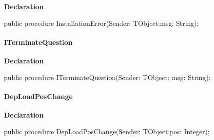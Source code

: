 \documentclass{report}
\newif\ifpdf
\begin{document}
\label{igobase.TIWizFrm-InstallationError}
\begin{list}{}{
\setlength{\itemindent}{0cm}
\setlength{\listparindent}{0cm}
\setlength{\leftmargin}{\evensidemargin}
\addtolength{\leftmargin}{\tmplength}
\settowidth{\labelsep}{X}
\addtolength{\leftmargin}{\labelsep}
\setlength{\labelwidth}{\tmplength}
}
\item[\textbf{Declaration}\hfill]
\ifpdf
\begin{flushleft}
\fi
\begin{ttfamily}
public procedure InstallationError(Sender: TObject;msg: String);\end{ttfamily}

\ifpdf
\end{flushleft}
\fi

\end{list}
\paragraph*{ITerminateQuestion}\hspace*{\fill}

\label{igobase.TIWizFrm-ITerminateQuestion}
\begin{list}{}{
\setlength{\itemindent}{0cm}
\setlength{\listparindent}{0cm}
\setlength{\leftmargin}{\evensidemargin}
\addtolength{\leftmargin}{\tmplength}
\settowidth{\labelsep}{X}
\addtolength{\leftmargin}{\labelsep}
\setlength{\labelwidth}{\tmplength}
}
\item[\textbf{Declaration}\hfill]
\ifpdf
\begin{flushleft}
\fi
\begin{ttfamily}
public procedure ITerminateQuestion(Sender: TObject; msg: String);\end{ttfamily}

\ifpdf
\end{flushleft}
\fi

\end{list}
\paragraph*{DepLoadPosChange}\hspace*{\fill}

\label{igobase.TIWizFrm-DepLoadPosChange}
\begin{list}{}{
\setlength{\itemindent}{0cm}
\setlength{\listparindent}{0cm}
\setlength{\leftmargin}{\evensidemargin}
\addtolength{\leftmargin}{\tmplength}
\settowidth{\labelsep}{X}
\addtolength{\leftmargin}{\labelsep}
\setlength{\labelwidth}{\tmplength}
}
\item[\textbf{Declaration}\hfill]
\ifpdf
\begin{flushleft}
\fi
\begin{ttfamily}
public procedure DepLoadPosChange(Sender: TObject;pos: Integer);\end{ttfamily}

\ifpdf
\end{flushleft}
\fi

\end{list}
\end{document}
